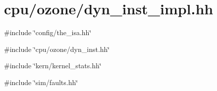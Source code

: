 \hypertarget{ozone_2dyn__inst__impl_8hh}{
\section{cpu/ozone/dyn\_\-inst\_\-impl.hh}
\label{ozone_2dyn__inst__impl_8hh}
}
{\ttfamily \#include \char`\"{}config/the\_\-isa.hh\char`\"{}}\par
{\ttfamily \#include \char`\"{}cpu/ozone/dyn\_\-inst.hh\char`\"{}}\par
{\ttfamily \#include \char`\"{}kern/kernel\_\-stats.hh\char`\"{}}\par
{\ttfamily \#include \char`\"{}sim/faults.hh\char`\"{}}\par
